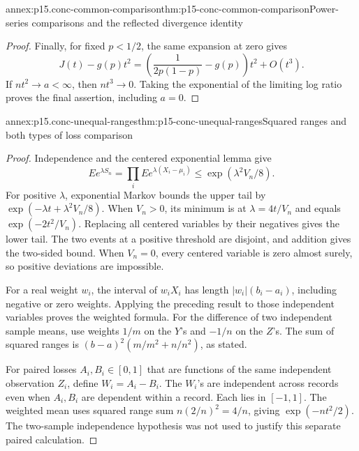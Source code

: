 \begin{annexitem}{annex:p15.conc-common-comparison}{thm:p15-conc-common-comparison}{Power-series comparisons and the reflected divergence identity}
\begin{proof}
Finally, for fixed \(p<1/2\), the same expansion at
zero gives
\[
 J(t)-g(p)t^2
    =\left(\frac1{2p(1-p)}-g(p)\right)t^2+O(t^3).
\]
If \(nt^2\to a<\infty\), then \(nt^3\to0\).
Taking the exponential of the limiting log ratio
proves the final assertion, including \(a=0\).
\end{proof}
\end{annexitem}

\begin{annexitem}{annex:p15.conc-unequal-ranges}{thm:p15-conc-unequal-ranges}{Squared ranges and both types of loss comparison}
\begin{proof}
Independence and the centered exponential lemma give
\[
 Ee^{\lambda S_n}
    =\prod_iEe^{\lambda(X_i-\mu_i)}
    \leq\exp(\lambda^2 V_n/8).
\]
For positive \(\lambda\), exponential Markov bounds the
upper tail by \(\exp(-\lambda t+\lambda^2V_n/8)\).
When \(V_n>0\), its minimum is at \(\lambda=4t/V_n\)
and equals \(\exp(-2t^2/V_n)\). Replacing all centered
variables by their negatives gives the lower tail.
The two events at a positive threshold are disjoint, and
addition gives the two-sided bound.
When \(V_n=0\), every centered variable is zero almost surely,
so positive deviations are impossible.

For a real weight \(w_i\), the interval of \(w_iX_i\)
has length \(|w_i|(b_i-a_i)\), including negative or zero
weights. Applying the preceding result to those independent
variables proves the weighted formula.
For the difference of two independent sample means, use
weights \(1/m\) on the \(Y\)'s and \(-1/n\) on the \(Z\)'s.
The sum of squared ranges is
\((b-a)^2(m/m^2+n/n^2)\), as stated.

For paired losses \(A_i,B_i\in[0,1]\) that are functions of
the same independent observation \(Z_i\), define \(W_i=A_i-B_i\).
The \(W_i\)'s are independent across records even when
\(A_i,B_i\) are dependent within a record.
Each lies in \([-1,1]\). The weighted mean uses squared
range sum \(n(2/n)^2=4/n\), giving
\(\exp(-nt^2/2)\).
The two-sample independence hypothesis was not used to
justify this separate paired calculation.
\end{proof}
\end{annexitem}

